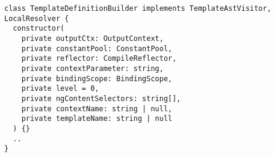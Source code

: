 \begin{verbatim}
class TemplateDefinitionBuilder implements TemplateAstVisitor, LocalResolver {
  constructor(
    private outputCtx: OutputContext,
    private constantPool: ConstantPool,
    private reflector: CompileReflector,
    private contextParameter: string,
    private bindingScope: BindingScope,
    private level = 0,
    private ngContentSelectors: string[],
    private contextName: string | null,
    private templateName: string | null
  ) {}
  ..
}
\end{verbatim}
